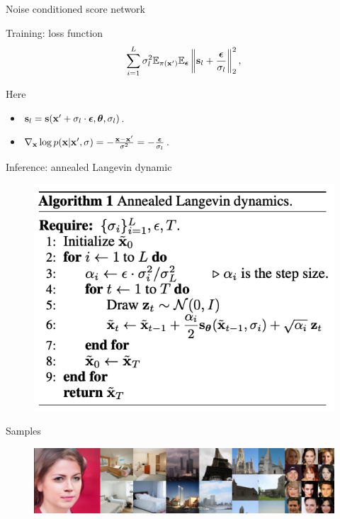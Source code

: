 \begin{frame}{Noise conditioned score network}
	
	\begin{minipage}{0.5\linewidth}
		\vspace{-0.7cm}
		\begin{block}{Training: loss function}
			\vspace{-0.8cm}
			\[
			\sum_{i=1}^L \sigma_l^2\mathbb{E}_{\pi(\mathbf{x}')} \mathbb{E}_{\boldsymbol{\epsilon}}\left\| \mathbf{s}_l + \frac{\boldsymbol{\epsilon}}{\sigma_l} \right\|^2_2,
			\]
		\end{block}
		\vspace{-0.5cm}
		Here
		\begin{itemize}
			\item $\mathbf{s}_l = \mathbf{s}(\mathbf{x}' + \sigma_l \cdot \boldsymbol{\epsilon}, \boldsymbol{\theta}, \sigma_l)$.
			\item $\nabla_{\mathbf{x}} \log p(\mathbf{x} | \mathbf{x}', \sigma) = - \frac{\mathbf{x} - \mathbf{x}'}{\sigma^2} = - \frac{\boldsymbol{\epsilon}}{\sigma_l}$.
		\end{itemize}
	\end{minipage}%
	\begin{minipage}{0.5\linewidth}
		\begin{block}{Inference: annealed Langevin dynamic}
			\begin{figure}
				\includegraphics[width=0.9\linewidth]{figs/ald}
			\end{figure}
		\end{block}
	\end{minipage}
	\vspace{-0.7cm}
	\begin{block}{Samples}
		\begin{figure}
			\includegraphics[width=\linewidth]{figs/NCSNv2}
		\end{figure}
	\end{block}
\end{frame}
